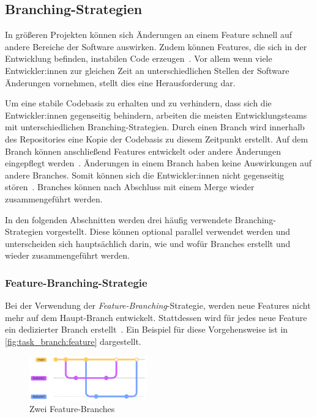 
\subsection{Branching-Strategien}
\label{sec:workflows:branching}

In größeren Projekten können sich Änderungen an einem Feature schnell auf andere Bereiche der Software auswirken. Zudem können Features, die sich in der Entwicklung befinden, instabilen Code erzeugen~\cite{sorin_dumitrescu_what_2021}. Vor allem wenn viele Entwickler:innen zur gleichen Zeit an unterschiedlichen Stellen der Software Änderungen vornehmen, stellt dies eine Herausforderung dar.

Um eine stabile Codebasis zu erhalten und zu verhindern, dass sich die Entwickler:innen gegenseitig behindern, arbeiten die meisten Entwicklungsteams mit unterschiedlichen Branching\hyp Strategien. Durch einen Branch wird innerhalb des Repositories eine Kopie der Codebasis zu diesem Zeitpunkt erstellt. Auf dem Branch können anschließend Features entwickelt oder andere Änderungen eingepflegt werden~\cite{atlassian_hintergrundwissen_2023}. Änderungen in einem Branch haben keine Auswirkungen auf andere Branches. Somit können sich die Entwickler:innen nicht gegenseitig stören~\cite{atlassian_hintergrundwissen_2023}. Branches können nach Abschluss mit einem Merge wieder zusammengeführt werden.

In den folgenden Abschnitten werden drei häufig verwendete Branching\hyp Strategien vorgestellt. Diese können optional parallel verwendet werden und unterscheiden sich hauptsächlich darin, wie und wofür Branches erstellt und wieder zusammengeführt werden.


\subsubsection{Feature\hyp Branching\hyp Strategie}

Bei der Verwendung der \emph{Feature\hyp Branching}\hyp Strategie, werden neue Features nicht mehr auf dem Haupt\hyp Branch entwickelt. Stattdessen wird für jedes neue Feature ein dedizierter Branch erstellt~\cite{atlassian_feature_2023}. Ein Beispiel für diese Vorgehensweise ist in \autoref{fig:task_branch:feature} dargestellt.

\begin{figure}
    \includegraphics[width=0.45\textwidth]{assets/diagrams/task_branch/feature-branch.pdf}
    \caption{Zwei Feature\hyp Branches}
    \label{fig:task_branch:feature}
\end{figure}

